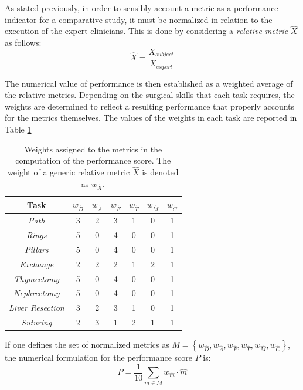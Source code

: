 \documentclass[../main.tex]{subfiles}
\begin{document}
As stated previously, in order to sensibly account a metric as a performance indicator for a comparative study, it must be normalized in relation to the execution of the expert clinicians. This is done by considering a \textit{relative metric} $\hat{X}$ as follows:
\begin{equation}
    \hat{X} = \frac{X_{subject}}{X_{expert}}
\end{equation}

The numerical value of performance is then established as a weighted average of the relative metrics. Depending on the surgical skills that each task requires, the weights are determined to reflect a resulting performance that properly accounts for the metrics themselves. The values of the weights in each task are reported in Table \ref{tab:performanceweights}

\begin{table}
    \caption{Weights assigned to the metrics in the computation of the performance score. The weight of a generic relative metric $\hat{X}$ is denoted as $w_{\hat{X}}$.}
    \centering
    \begin{tabular}{||c||c|c|c|c|c|c||}
        \hline
        \textbf{Task} & $w_{\hat{D}}$ & $w_{\hat{A}}$ & $w_{\hat{F}}$ & $w_{\hat{T}}$ & $w_{\hat{M}}$ & $w_{\hat{C}}$ \\
        \hline\hline
        \textit{Path}            & 3 & 2 & 3 & 1 & 0 & 1 \\
        \hline
        \textit{Rings}           & 5 & 0 & 4 & 0 & 0 & 1 \\
        \hline
        \textit{Pillars}         & 5 & 0 & 4 & 0 & 0 & 1 \\
        \hline
        \textit{Exchange}        & 2 & 2 & 2 & 1 & 2 & 1 \\
        \hline
        \textit{Thymectomy}      & 5 & 0 & 4 & 0 & 0 & 1 \\
        \hline
        \textit{Nephrectomy}     & 5 & 0 & 4 & 0 & 0 & 1 \\
        \hline
        \textit{Liver Resection} & 3 & 2 & 3 & 1 & 0 & 1 \\
        \hline
        \textit{Suturing}        & 2 & 3 & 1 & 2 & 1 & 1 \\
        \hline
    \end{tabular}
    \label{tab:performanceweights}
\end{table} 

If one defines the set of normalized metrics as $M = \left\{ w_{\hat{D}}, w_{\hat{A}}, w_{\hat{F}}, w_{\hat{T}}, w_{\hat{M}}, w_{\hat{C}}\right\}$, the numerical formulation for the performance score $P$ is:
\begin{equation}
    P = \frac{1}{10}\sum_{m\in M} w_{\hat{m}}\cdot\hat{m}
    \label{eq:performance}
\end{equation}
\end{document}
